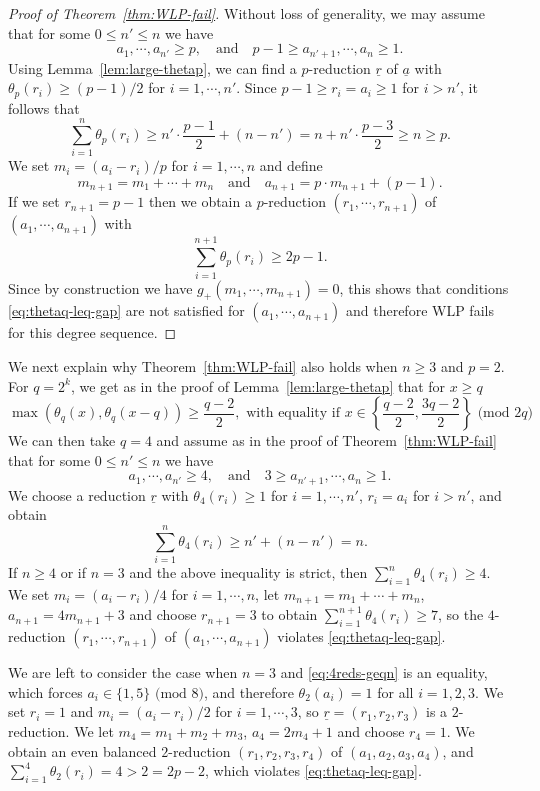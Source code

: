 \documentclass[11pt,reqno]{amsart}
\newcommand{\ul}[1]{\underline{#1}}
\theoremstyle{definition}
\theoremstyle{remark}
\numberwithin{equation}{section}
\begin{document}
\begin{proof}[Proof of Theorem~\ref{thm:WLP-fail}] Without loss of generality, we may assume that for some $0\leq n'\leq n$ we have
\[ a_1,\cdots,a_{n'}\geq p,\quad\text{and}\quad p-1\geq a_{n'+1},\cdots,a_n\geq 1.\]
Using Lemma~\ref{lem:large-thetap}, we can find a $p$-reduction $\ul{r}$ of $\ul{a}$ with $\theta_p(r_i)\geq(p-1)/2$ for $i=1,\cdots,n'$. Since $p-1\geq r_i=a_i\geq 1$ for $i>n'$, it follows that
\[\sum_{i=1}^n\theta_p(r_i) \geq n'\cdot\frac{p-1}{2} + (n-n') = n + n'\cdot\frac{p-3}{2}\geq n\geq p.\]
We set $m_i=(a_i-r_i)/p$ for $i=1,\cdots,n$ and define
\[ m_{n+1} = m_1+\cdots+m_n\quad\text{and}\quad a_{n+1} = p\cdot m_{n+1}+(p-1).\]
If we set $r_{n+1}=p-1$ then we obtain a $p$-reduction $(r_1,\cdots,r_{n+1})$ of $(a_1,\cdots,a_{n+1})$ with
\[\sum_{i=1}^{n+1}\theta_p(r_i) \geq 2p-1.\]
Since by construction we have $g_+(m_1,\cdots,m_{n+1})=0$, this shows that conditions \eqref{eq:thetaq-leq-gap} are not satisfied for $(a_1,\cdots,a_{n+1})$ and therefore WLP fails for this degree sequence.
\end{proof}

We next explain why Theorem~\ref{thm:WLP-fail} also holds when $n\geq 3$ and $p=2$. For $q=2^k$, we get as in the proof of Lemma~\ref{lem:large-thetap} that for $x\geq q$
\[\max\left(\theta_q(x),\theta_q(x-q)\right) \geq \frac{q-2}{2},\text{ with equality if }x\in\left\{\frac{q-2}{2},\frac{3q-2}{2}\right\}\text{ (mod $2q$)}\]
We can then take $q=4$ and assume as in the proof of Theorem~\ref{thm:WLP-fail} that for some $0\leq n'\leq n$ we have
\[ a_1,\cdots,a_{n'}\geq 4,\quad\text{and}\quad 3\geq a_{n'+1},\cdots,a_n\geq 1.\]
We choose a reduction $\ul{r}$ with $\theta_4(r_i)\geq 1$ for $i=1,\cdots,n'$, $r_i=a_i$ for $i>n'$, and obtain
\begin{equation}\label{eq:4reds-geqn}
\sum_{i=1}^n\theta_4(r_i) \geq n' + (n-n') = n.
\end{equation}
If $n\geq 4$ or if $n=3$ and the above inequality is strict, then $\sum_{i=1}^n\theta_4(r_i)\geq 4$. We set $m_i=(a_i-r_i)/4$ for $i=1,\cdots,n$, let $m_{n+1}=m_1+\cdots+m_n$, $a_{n+1}=4m_{n+1}+3$ and choose $r_{n+1}=3$ to obtain $\sum_{i=1}^{n+1}\theta_4(r_i) \geq 7$, so the $4$-reduction $(r_1,\cdots,r_{n+1})$ of $(a_1,\cdots,a_{n+1})$ violates \eqref{eq:thetaq-leq-gap}. 

We are left to consider the case when $n=3$ and \eqref{eq:4reds-geqn} is an equality, which forces $a_i\in\{1,5\}\text{ (mod $8$)}$, and therefore $\theta_2(a_i)=1$ for all $i=1,2,3$. We set $r_i=1$ and $m_i=(a_i-r_i)/2$ for $i=1,\cdots,3$, so $\ul{r}=(r_1,r_2,r_3)$ is a $2$-reduction. We let $m_{4}=m_1+m_2+m_3$, $a_{4}=2m_{4}+1$ and choose $r_{4}=1$. We obtain an even balanced $2$-reduction $(r_1,r_2,r_3,r_4)$ of $(a_1,a_2,a_3,a_4)$, and
$\sum_{i=1}^{4}\theta_2(r_i) = 4 > 2=2p-2$,
which violates \eqref{eq:thetaq-leq-gap}.
\end{document}
